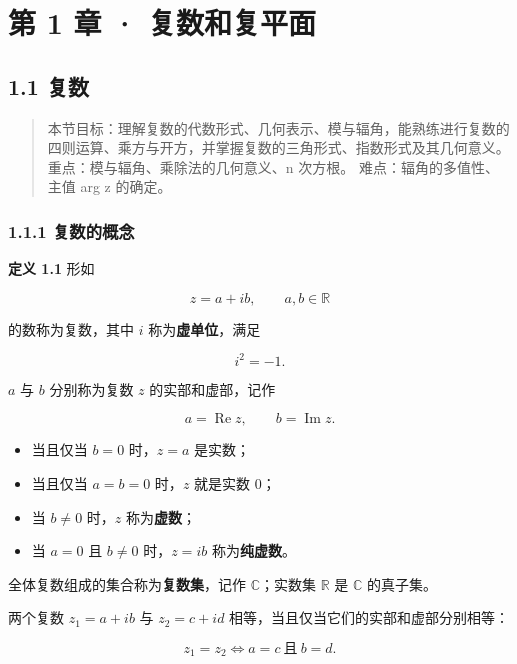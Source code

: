 \chapter{第 1 章 ·
复数和复平面}\label{ux7b2c-1-ux7ae0-ux590dux6570ux548cux590dux5e73ux9762}

\section{1.1 复数}\label{ux590dux6570}

\begin{quote}
本节目标：理解复数的代数形式、几何表示、模与辐角，能熟练进行复数的四则运算、乘方与开方，并掌握复数的三角形式、指数形式及其几何意义。
重点：模与辐角、乘除法的几何意义、n 次方根。 难点：辐角的多值性、主值
arg z 的确定。
\end{quote}

\subsection{1.1.1 复数的概念}\label{ux590dux6570ux7684ux6982ux5ff5}

\textbf{定义 1.1} 形如

\[
z = a + ib,\qquad a,b \in \mathbb{R}
\]

的数称为复数，其中 \(i\) 称为\textbf{虚单位}，满足

\[
i^2 = -1 .
\]

\(a\) 与 \(b\) 分别称为复数 \(z\) 的实部和虚部，记作

\[
a = \operatorname{Re} z,\qquad b = \operatorname{Im} z .
\]

\begin{itemize}
\tightlist
\item
  当且仅当 \(b=0\) 时，\(z=a\) 是实数；
\item
  当且仅当 \(a=b=0\) 时，\(z\) 就是实数 \(0\)；
\item
  当 \(b\neq 0\) 时，\(z\) 称为\textbf{虚数}；
\item
  当 \(a=0\) 且 \(b\neq 0\) 时，\(z=ib\) 称为\textbf{纯虚数}。
\end{itemize}

全体复数组成的集合称为\textbf{复数集}，记作 \(\mathbb{C}\)；实数集
\(\mathbb{R}\) 是 \(\mathbb{C}\) 的真子集。

两个复数 \(z_1=a+ib\) 与 \(z_2=c+id\)
相等，当且仅当它们的实部和虚部分别相等：

\[
z_1 = z_2 \iff a=c \ \text{且}\ b=d .
\]

